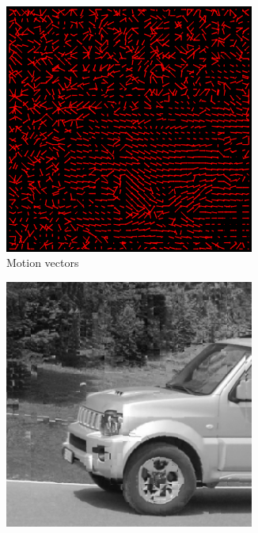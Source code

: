 \documentclass{homework}
\begin{document}
\begin{figure}[H]
    \centering
    \begin{subfigure}{0.32\textwidth}
        \centering
        \includegraphics[width=0.9\textwidth]{8_8_motion_vectors.png}
        \caption{Motion vectors}
    \end{subfigure}
    \begin{subfigure}{0.32\textwidth}
        \centering
        \includegraphics[width=0.9\textwidth]{8_8_motion_compensation.png}

\end{subfigure}
\end{figure}
\end{document}
